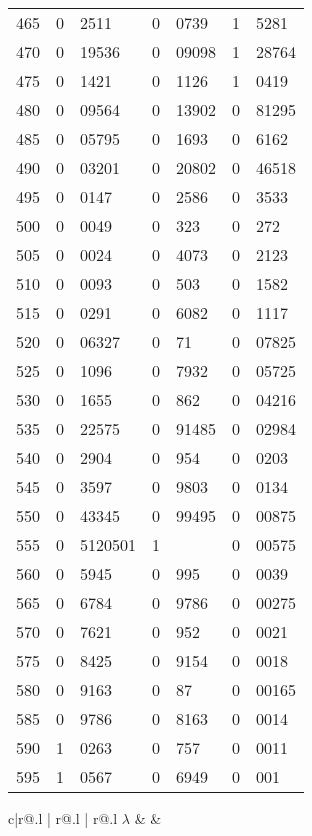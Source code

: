 \begin{table}
{\begin{minipage}[t]{.48\linewidth}
\begin{tabular}{c|r@{.}l | r@{.}l | r@{.}l}
465 & 0&2511    & 0&0739      & 1&5281 \\
470 & 0&19536   & 0&09098     & 1&28764 \\
475 & 0&1421    & 0&1126      & 1&0419 \\
480 & 0&09564   & 0&13902     & 0&81295 \\
485 & 0&05795   & 0&1693      & 0&6162 \\
490 & 0&03201   & 0&20802     & 0&46518 \\
495 & 0&0147    & 0&2586      & 0&3533 \\
500 & 0&0049    & 0&323       & 0&272 \\
505 & 0&0024    & 0&4073      & 0&2123 \\
510 & 0&0093    & 0&503       & 0&1582 \\
515 & 0&0291    & 0&6082      & 0&1117 \\
520 & 0&06327   & 0&71        & 0&07825 \\
525 & 0&1096    & 0&7932      & 0&05725 \\
530 & 0&1655    & 0&862       & 0&04216 \\
535 & 0&22575   & 0&91485     & 0&02984 \\
540 & 0&2904    & 0&954       & 0&0203 \\
545 & 0&3597    & 0&9803      & 0&0134 \\
550 & 0&43345   & 0&99495     & 0&00875 \\
555 & 0&5120501 & 1&          & 0&00575 \\
560 & 0&5945    & 0&995       & 0&0039 \\
565 & 0&6784    & 0&9786      & 0&00275 \\
570 & 0&7621    & 0&952       & 0&0021 \\
575 & 0&8425    & 0&9154      & 0&0018 \\
580 & 0&9163    & 0&87        & 0&00165 \\
585 & 0&9786    & 0&8163      & 0&0014 \\
590 & 1&0263    & 0&757       & 0&0011 \\
595 & 1&0567    & 0&6949      & 0&001 \\
\end{tabular}
\end{minipage}\hfill%
\begin{minipage}[t]{.48\linewidth}
\vspace{0pt}\centering
\begin{tabular}{c|r@{.}l | r@{.}l | r@{.}l}
$\lambda$ &  &  
\end{tabular}
\end{minipage}}
\end{table}
